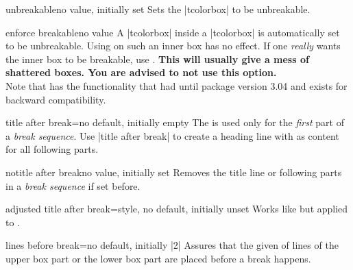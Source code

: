 \begin{docTcbKey}{unbreakable}{}{no value, initially set}
  Sets the |tcolorbox| to be unbreakable.
\end{docTcbKey}


\begin{docTcbKey}{enforce breakable}{}{no value}
  A |tcolorbox| inside a |tcolorbox| is automatically set to be unbreakable.
  Using  on such an inner box has no effect.
  If one \emph{really} wants the inner box to be breakable, use .
  \textbf{This will usually give a mess of shattered boxes. You are advised to not use this option.}\\
  Note that  has the functionality
  that  had until package version 3.04
  and exists for backward compatibility.
\end{docTcbKey}


\begin{docTcbKey}{title after break}{=}{no default, initially empty}
  The  is used only for the \emph{first} part of a
  \emph{break sequence}. Use |title after break| to create a heading line
  with  as content for all following parts.
\end{docTcbKey}


\begin{docTcbKey}{notitle after break}{}{no value, initially set}
  Removes the title line or following parts in a  \emph{break sequence} if set before.
\end{docTcbKey}


\begin{docTcbKey}{adjusted title after break}{=}{style, no default, initially unset}
  Works like  but applied to .
\end{docTcbKey}


\begin{docTcbKey}{lines before break}{=}{no default, initially |2|}
  Assures that the given  of lines of the upper box part or
  the lower box part are placed before a break happens.
\end{docTcbKey}

